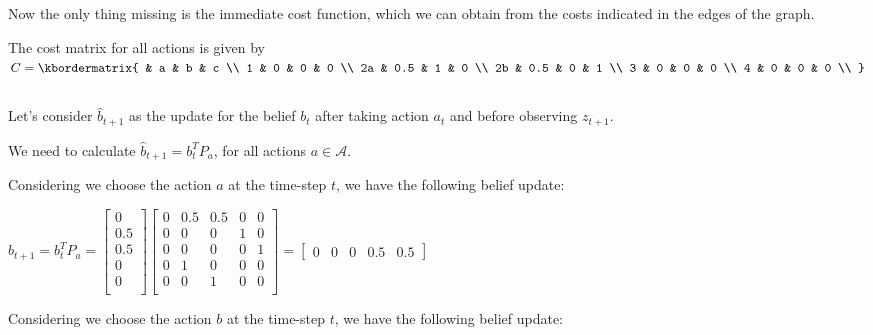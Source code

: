\documentclass{article}
\begin{document}
Now the only thing missing is the immediate cost function, which we can obtain from
the costs indicated in the edges of the graph.

\medskip

The cost matrix for all actions is given by 
$
  C = \kbordermatrix{
    & a & b & c \\
    1 & 0 & 0 & 0 \\
    2a & 0.5 & 1 & 0 \\
    2b & 0.5 & 0 & 1 \\
    3 & 0 & 0 & 0 \\
    4 & 0 & 0 & 0 \\
  }
$

\medskip

\subsection{}

Let's consider $\hat{b}_{t+1}$ as the update for the belief $b_t$ after taking action $a_t$ and before observing $z_{t+1}$. 

We need to calculate $\hat{b}_{t+1} = b_t^T P_a$, for all actions $a \in \mathcal{A}$.

\bigskip

Considering we choose the action $a$ at the time-step $t$, we have the following belief update:

\medskip

$
  \hat{b}_{t+1} = b_t^T P_a = 
  \begin{bmatrix}
    0 \\
    0.5 \\
    0.5 \\
    0 \\
    0 \\
  \end{bmatrix}
  \begin{bmatrix}
    0 & 0.5 & 0.5 & 0 & 0 \\
    0 & 0 & 0 & 1 & 0 \\
    0 & 0 & 0 & 0 & 1 \\
    0 & 1 & 0 & 0 & 0 \\
    0 & 0 & 1 & 0 & 0 \\
  \end{bmatrix} = \begin{bmatrix}
    0 & 0 & 0 & 0.5 & 0.5
  \end{bmatrix}
$

\bigskip

Considering we choose the action $b$ at the time-step $t$, we have the following belief update:
\end{document}
